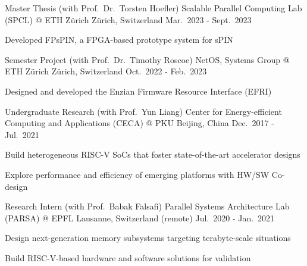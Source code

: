

\begin{cventries}

  \cventry
    {Master Thesis (with Prof.\ Dr.\ Torsten Hoefler)} %
    {Scalable Parallel Computing Lab (SPCL) @ ETH Z\"urich} %
    {Z\"urich, Switzerland} %
    {Mar.\ 2023 - Sept.\ 2023} %
    {
      \begin{cvitems} %
        \item {Developed FPsPIN, a FPGA-based prototype system for sPIN}
      \end{cvitems}
    }

  \cventry
    {Semester Project (with Prof.\ Dr.\ Timothy Roscoe)} %
    {NetOS, Systems Group @ ETH Z\"urich} %
    {Z\"urich, Switzerland} %
    {Oct.\ 2022 - Feb.\ 2023} %
    {
      \begin{cvitems} %
        \item {Designed and developed the Enzian Firmware Resource Interface (EFRI)}
      \end{cvitems}
    }

  \cventry
    {Undergraduate Research (with Prof.\ Yun Liang)} %
    {Center for Energy-efficient Computing and Applications (CECA) @ PKU} %
    {Beijing, China} %
    {Dec.\ 2017 - Jul.\ 2021} %
    {
      \begin{cvitems} %
        \item {Build heterogeneous RISC-V SoCs that foster state-of-the-art accelerator designs}
        \item {Explore performance and efficiency of emerging platforms with HW/SW Co-design}
      \end{cvitems}
    }

  \cventry
    {Research Intern (with Prof.\ Babak Falsafi)} %
    {Parallel Systems Architecture Lab (PARSA) @ EPFL} %
    {Lausanne, Switzerland (remote)} %
    {Jul.\ 2020 - Jan.\ 2021} %
    {
      \begin{cvitems} %
        \item {Design next-generation memory subsystems targeting terabyte-scale situations}
        \item {Build RISC-V-based hardware and software solutions for validation}
      \end{cvitems}
    }


\end{cventries}
